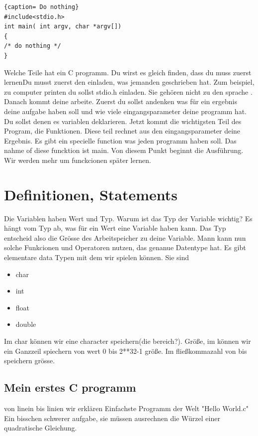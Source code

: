 \documentclass{article}[12pt]
\begin{document}
\begin{lstlisting}{caption= Do nothing}
#include<stdio.h>
int main( int argv, char *argv[])
{
/* do nothing */
}
\end{lstlisting}
Welche Teile hat ein C programm. 
Du wirst es gleich finden, dass du muss zuerst lernenDu musst zuerst den einladen, was jemanden 
geschrieben hat. Zum beispiel, zu computer printen du sollst stdio.h einladen. Sie
gehören nicht zu den sprache . Danach kommt deine arbeite. Zuerst du sollst andenken was für ein ergebnis deine aufgabe haben soll und
wie viele eingangsparameter deine programm hat. Du sollst denen es variablen deklarieren. Jetzt kommt die wichtigsten Teil des Program, die
Funktionen. Diese teil rechnet aus den eingangsparameter deine Ergebnis. Es gibt ein specielle function was jeden programm haben
soll. Das nahme of diese funcktion ist main. Von diesem Punkt beginnt die Ausführung. Wir werden mehr um funckcionen später lernen.  
\section{Definitionen, Statements}
Die Variablen haben Wert und Typ. Warum ist das Typ der Variable wichtig? Es hängt vom Typ ab, was für ein Wert eine Variable haben
kann. Das Typ entscheid also die Grösse des Arbeitspeicher zu deine Variable. Mann kann nun solche Funkcionen und Operatoren nutzen, das 
genanue Datentype hat. Es gibt elementare data Typen mit dem wir spielen können. Sie sind
\begin{itemize}
\item char
\item int
\item float
\item double
\end{itemize}
Im char können wir eine character speichern(die bereich?). Größe, im können wir ein Ganzzeil spiechern von wert 0 bis 2**32-1 größe. 
Im fließkommazahl von bis speichern grösse.
\subsection{Mein erstes C programm}
von linein bis linien wir erklären Einfachste Programm der Welt "Hello World.c"
Ein bisschen schwerer aufgabe, sie müssen ausrechnen die Würzel einer quadratische Gleichung. 
\end{document}
